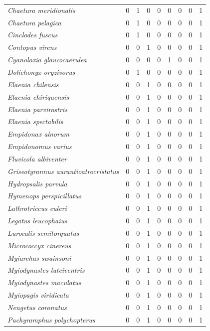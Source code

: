 \documentclass[
  oneside]{scrbook}
\begin{document}
\begin{longtable}[t]{>{}lrrrrrlrl}
\em{Chaetura meridionalis} & 0 & 1 & 0 & 0 & 0 & 0 & 0 & 1\\
\addlinespace
\em{Chaetura pelagica} & 0 & 1 & 0 & 0 & 0 & 0 & 0 & 1\\
\em{Cinclodes fuscus} & 0 & 1 & 0 & 0 & 0 & 0 & 0 & 1\\
\em{Contopus virens} & 0 & 0 & 1 & 0 & 0 & 0 & 0 & 1\\
\em{Cyanoloxia glaucocaerulea} & 0 & 0 & 0 & 0 & 1 & 0 & 0 & 1\\
\em{Dolichonyx oryzivorus} & 0 & 1 & 0 & 0 & 0 & 0 & 0 & 1\\
\addlinespace
\em{Elaenia chilensis} & 0 & 0 & 1 & 0 & 0 & 0 & 0 & 1\\
\em{Elaenia chiriquensis} & 0 & 0 & 1 & 0 & 0 & 0 & 0 & 1\\
\em{Elaenia parvirostris} & 0 & 0 & 1 & 0 & 0 & 0 & 0 & 1\\
\em{Elaenia spectabilis} & 0 & 0 & 1 & 0 & 0 & 0 & 0 & 1\\
\em{Empidonax alnorum} & 0 & 0 & 1 & 0 & 0 & 0 & 0 & 1\\
\addlinespace
\em{Empidonomus varius} & 0 & 0 & 1 & 0 & 0 & 0 & 0 & 1\\
\em{Fluvicola albiventer} & 0 & 0 & 1 & 0 & 0 & 0 & 0 & 1\\
\em{Griseotyrannus aurantioatrocristatus} & 0 & 0 & 1 & 0 & 0 & 0 & 0 & 1\\
\em{Hydropsalis parvula} & 0 & 0 & 1 & 0 & 0 & 0 & 0 & 1\\
\em{Hymenops perspicillatus} & 0 & 0 & 1 & 0 & 0 & 0 & 0 & 1\\
\addlinespace
\em{Lathrotriccus euleri} & 0 & 0 & 1 & 0 & 0 & 0 & 0 & 1\\
\em{Legatus leucophaius} & 0 & 0 & 1 & 0 & 0 & 0 & 0 & 1\\
\em{Lurocalis semitorquatus} & 0 & 0 & 1 & 0 & 0 & 0 & 0 & 1\\
\em{Micrococcyx cinereus} & 0 & 0 & 1 & 0 & 0 & 0 & 0 & 1\\
\em{Myiarchus swainsoni} & 0 & 0 & 1 & 0 & 0 & 0 & 0 & 1\\
\addlinespace
\em{Myiodynastes luteiventris} & 0 & 0 & 1 & 0 & 0 & 0 & 0 & 1\\
\em{Myiodynastes maculatus} & 0 & 0 & 1 & 0 & 0 & 0 & 0 & 1\\
\em{Myiopagis viridicata} & 0 & 0 & 1 & 0 & 0 & 0 & 0 & 1\\
\em{Nengetus coronatus} & 0 & 0 & 1 & 0 & 0 & 0 & 0 & 1\\
\em{Pachyramphus polychopterus} & 0 & 0 & 1 & 0 & 0 & 0 & 0 & 1\\

\end{longtable}
\end{document}
